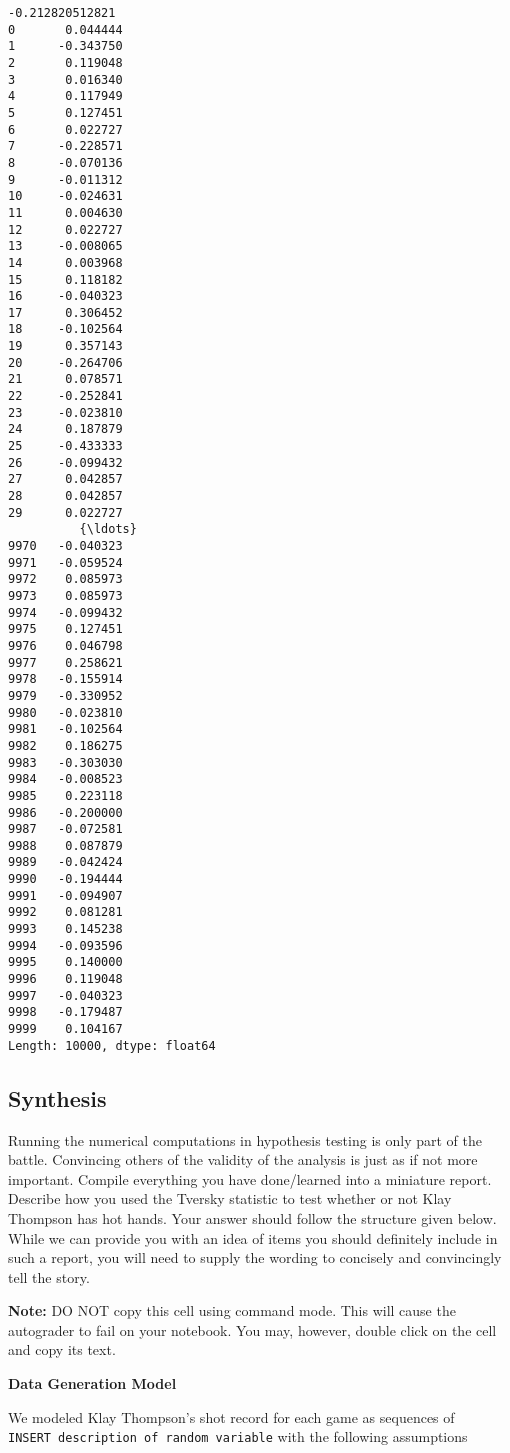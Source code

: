 \documentclass[11pt]{article}
\begin{document}
    \begin{Verbatim}[commandchars=\\\{\}]
-0.212820512821
0       0.044444
1      -0.343750
2       0.119048
3       0.016340
4       0.117949
5       0.127451
6       0.022727
7      -0.228571
8      -0.070136
9      -0.011312
10     -0.024631
11      0.004630
12      0.022727
13     -0.008065
14      0.003968
15      0.118182
16     -0.040323
17      0.306452
18     -0.102564
19      0.357143
20     -0.264706
21      0.078571
22     -0.252841
23     -0.023810
24      0.187879
25     -0.433333
26     -0.099432
27      0.042857
28      0.042857
29      0.022727
          {\ldots}   
9970   -0.040323
9971   -0.059524
9972    0.085973
9973    0.085973
9974   -0.099432
9975    0.127451
9976    0.046798
9977    0.258621
9978   -0.155914
9979   -0.330952
9980   -0.023810
9981   -0.102564
9982    0.186275
9983   -0.303030
9984   -0.008523
9985    0.223118
9986   -0.200000
9987   -0.072581
9988    0.087879
9989   -0.042424
9990   -0.194444
9991   -0.094907
9992    0.081281
9993    0.145238
9994   -0.093596
9995    0.140000
9996    0.119048
9997   -0.040323
9998   -0.179487
9999    0.104167
Length: 10000, dtype: float64

    \end{Verbatim}

    \subsection{Synthesis}\label{synthesis}

Running the numerical computations in hypothesis testing is only part of
the battle. Convincing others of the validity of the analysis is just as
if not more important. Compile everything you have done/learned into a
miniature report. Describe how you used the Tversky statistic to test
whether or not Klay Thompson has hot hands. Your answer should follow
the structure given below. While we can provide you with an idea of
items you should definitely include in such a report, you will need to
supply the wording to concisely and convincingly tell the story.

\textbf{Note:} DO NOT copy this cell using command mode. This will cause
the autograder to fail on your notebook. You may, however, double click
on the cell and copy its text.

\textbf{Data Generation Model}

We modeled Klay Thompson's shot record for each game as sequences of
\texttt{INSERT\ description\ of\ random\ variable} with the following
assumptions
\end{document}
